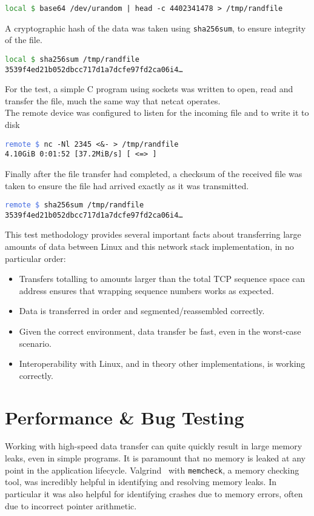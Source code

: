     \texttt{\small\textcolor{ForestGreen}{local \$} base64 /dev/urandom | head -c 4402341478 > /tmp/randfile}

    A cryptographic hash of the data was taken using \texttt{sha256sum}, to ensure integrity of the file.

    \texttt{\small\textcolor{ForestGreen}{local \$} sha256sum /tmp/randfile\\3539f4ed21b052dbcc717d1a7dcfe97fd2ca06i4\ldots}

    For the test, a simple C program using sockets was written to open, read and transfer the file, much the same way that netcat operates.\\
    The remote device was configured to listen for the incoming file and to write it to disk

    \texttt{\small\textcolor{RoyalBlue}{remote \$} nc -Nl 2345 <\&- > /tmp/randfile\\4.10GiB 0:01:52 [37.2MiB/s] [  <=>  ]}

    Finally after the file transfer had completed, a checksum of the received file was taken to ensure the file had arrived exactly as it was transmitted.

    \texttt{\small\textcolor{RoyalBlue}{remote \$} sha256sum /tmp/randfile\\3539f4ed21b052dbcc717d1a7dcfe97fd2ca06i4\ldots}

    This test methodology provides several important facts about transferring large amounts of data between Linux and this network stack implementation, in no particular order:
    \begin{itemize}[noitemsep]
        \item{Transfers totalling to amounts larger than the total TCP sequence space can address ensures that wrapping sequence numbers works as expected.}
        \item{Data is transferred in order and segmented/reassembled correctly.}
        \item{Given the correct environment, data transfer be fast, even in the worst-case scenario.}
        \item{Interoperability with Linux, and in theory other implementations, is working correctly.}
    \end{itemize}

    \section{Performance \& Bug Testing}\label{sec:perf-bug-testing}
    Working with high-speed data transfer can quite quickly result in large memory leaks, even in simple programs. It is paramount that no memory is leaked at any point in the application lifecycle. Valgrind~\cite{valgrind} with \texttt{memcheck}, a memory checking tool, was incredibly helpful in identifying and resolving memory leaks. In particular it was also helpful for identifying crashes due to memory errors, often due to incorrect pointer arithmetic.

